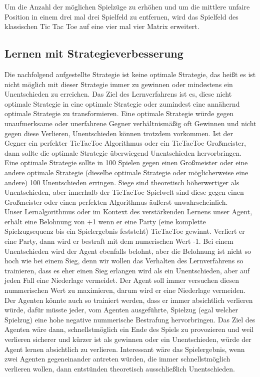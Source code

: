 Um die Anzahl der möglichen Spielzüge zu erhöhen und um die mittlere unfaire Position in einem drei mal drei Spielfeld zu entfernen, wird das Spielfeld des klassischen Tic Tac Toe auf eine vier mal vier Matrix erweitert.

\subsection{Lernen mit Strategieverbesserung}
Die nachfolgend aufgestellte Strategie ist keine optimale Strategie, das heißt es ist nicht möglich mit dieser Strategie immer zu gewinnen oder mindestens ein Unentschieden zu erreichen. Das Ziel des Lernverfahrens ist es, diese nicht optimale Strategie in eine optimale Strategie oder zumindest eine annähernd optimale Strategie zu transformieren. Eine optimale Strategie würde gegen unaufmerksame oder unerfahrene Gegner verhältnismäßig oft Gewinnen und nicht gegen diese Verlieren, Unentschieden können trotzdem vorkommen. Ist der Gegner ein perfekter TicTacToe Algorithmus oder ein TicTacToe Großmeister, dann sollte die optimale Strategie überwiegend Unentschieden hervorbringen. Eine optimale Strategie sollte in 100 Spielen gegen einen Großmeister oder eine andere optimale Strategie (dieselbe optimale Strategie oder möglicherweise eine andere) 100 Unentschieden erringen. Siege sind theoretisch höherwertiger als Unentschieden, aber innerhalb der TicTacToe Spielwelt sind diese gegen einen Großmeister oder einen perfekten Algorithmus äußerst unwahrscheinlich. \\

Unser Lernalgorithmus oder im Kontext des verstärkenden Lernens unser Agent, erhält eine Belohnung von +1 wenn er eine Party (eine komplette Spielzugsequenz bis ein Spielergebnis feststeht) TicTacToe gewinnt. Verliert er eine Party, dann wird er bestraft mit dem numerischen Wert -1. Bei einem Unentschieden wird der Agent ebenfalls belohnt, aber die Belohnung ist nicht so hoch wie bei einem Sieg, denn wir wollen das Verhalten des Lernverfahrens so trainieren, dass es eher einen Sieg erlangen wird als ein Unentschieden, aber auf jeden Fall eine Niederlage vermeidet. Der Agent soll immer versuchen diesen nummerischen Wert zu maximieren, darum wird er eine Niederlage vermeiden. Der Agenten könnte auch so trainiert werden, dass er immer absichtlich verlieren würde, dafür müsste jeder, vom Agenten ausgeführte, Spielzug (egal welcher Spielzug) eine hohe negative nummerische Bestrafung hervorbringen. Das Ziel des Agenten wäre dann, schnellstmöglich ein Ende des Spiels zu provozieren und weil verlieren sicherer und kürzer ist als gewinnen oder ein Unentschieden, würde der Agent lernen absichtlich zu verlieren. Interessant wäre das Spielergebnis, wenn zwei Agenten gegeneinander antreten würden, die immer schnellstmöglich verlieren wollen, dann entstünden theoretisch ausschließlich Unentschieden.


